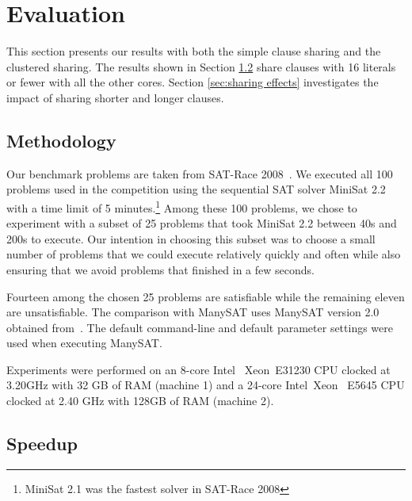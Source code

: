 \documentclass[letterpaper, compsoc, conference]{IEEEtran}
\begin{document}
\section{Evaluation}
\label{sec:results}

This section presents our results with both the simple clause sharing and the
clustered sharing. The results shown in Section \ref{sec:speedup} share clauses
with 16 literals or fewer with all the other cores. Section \ref{sec:sharing
effects} investigates the impact of sharing shorter and longer clauses.

\subsection{Methodology}
Our benchmark problems are taken from SAT-Race 2008~\cite{SATRace2008}. We
executed all 100 problems used in the competition using the sequential SAT
solver MiniSat 2.2 with a time limit of 5 minutes.\footnote{MiniSat 2.1 was the
fastest solver in SAT-Race 2008} Among these 100 problems, we chose to
experiment with a subset of 25 problems that took MiniSat 2.2 between 40s and
200s to execute. Our intention in choosing this subset was to choose a small
number of problems that we could execute relatively quickly and often while
also ensuring that we avoid problems that finished in a few seconds.

Fourteen among the chosen 25 problems are satisfiable while the remaining
eleven are unsatisfiable. The comparison with ManySAT uses ManySAT version 2.0
obtained from~\cite{ManySATWeb}.  The default command-line and default
parameter settings were used when executing ManySAT.


Experiments were performed on an 8-core Intel\textregistered
~Xeon\textregistered ~E31230 CPU clocked at 3.20GHz with 32 GB of RAM (machine
1) and a 24-core Intel\textregistered~Xeon ~E5645 CPU clocked at 2.40 GHz with
128GB of RAM (machine 2). 

\subsection{Speedup}
\label{sec:speedup}
\end{document}
